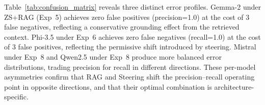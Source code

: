 \documentclass{ieeeaccess}
\begin{document}
Table~\ref{tab:confusion_matrix} reveals three distinct error profiles. Gemma-2 under ZS+RAG (Exp~5) achieves zero false positives (precision=1.0) at the cost of 3 false negatives, reflecting a conservative grounding effect from the retrieved context. Phi-3.5 under Exp~6 achieves zero false negatives (recall=1.0) at the cost of 3 false positives, reflecting the permissive shift introduced by steering. Mistral under Exp~8 and Qwen2.5 under Exp~8 produce more balanced error distributions, trading precision for recall in different directions. These per-model asymmetries confirm that RAG and Steering shift the precision--recall operating point in opposite directions, and that their optimal combination is architecture-specific.

\begin{figure}[htbp]
\centering
{}
\end{figure}
\end{document}
